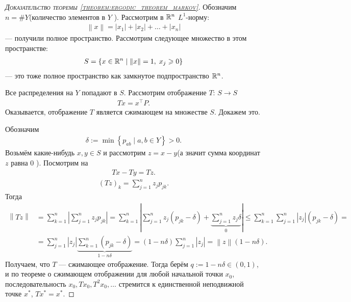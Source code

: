 \documentclass[../main.tex]{subfiles}
\begin{document}
\begin{proof}[\normalfont\textsc{Доказательство теоремы \ref{theorem:ergodic_theorem_markov}}]
 Обозначим $n = \# Y $(количество элементов в $Y$ ). Рассмотрим в $ \mathbb{R}^{n} $ $ L^{1} $-норму:
 \begin{align*}
  \left\| x \right\| = \left| x_1 \right| + \left| x_2 \right| + \ldots + \left| x_n \right|
 \end{align*} --- получили полное пространство. Рассмотрим следующее множество в этом пространстве:
 \begin{align*}
  S = \left\{ x \in \mathbb{R}^{n} \mid \left\| x \right\| = 1,\; x_j \geqslant 0 \right\}
 \end{align*} --- это тоже полное пространство как замкнутое подпространство $ \mathbb{R}^{n} $.

 Все распределения на $ Y $ попадают в $ S $. Рассмотрим отображение $ T \colon\,S\to S $
 \begin{align*}
  T x = x^{\top} P.
 \end{align*} Оказывается, отображение $ T $ является сжимающем на множестве $ S $. Докажем это.

 Обозначим
 \begin{align*}
  \delta := \min \left\{ p_{ab} \mid a,b\in Y \right\} > 0.
 \end{align*} Возьмём какие-нибудь $ x,y \in S $ и рассмотрим $ z = x - y $(а значит сумма координат $z$ равна 0 ). Посмотрим на
 \begin{align*}
  Tx - Ty = Tz.
 \end{align*}
 \begin{align*}
  (Tz)_k = \sum_{j=1}^{n} z_j p_{jk}.
 \end{align*} Тогда
 \begin{align*}
  \left\| Tz \right\| &= \sum_{k=1}^{n} \left|\sum_{j=1}^{n} z_j p_{jk} \right| = \sum_{k=1}^{n} \left| \sum_{j=1}^{n} z_j(p_{jk} - \delta) + \underbrace{\sum_{j=1}^{n} z_j \delta}_0 \right| \leqslant \sum_{k=1}^{n} \sum_{j=1}^{n} \left| z_j \right|(p_{jk} - \delta) = \\
  &= \sum_{j=1}^{n} \left| z_j \right| \underbrace{\sum_{k=1}^{n} (p_{jk} - \delta)}_{1-n\delta} = (1-n\delta) \sum_{j=1}^{n} \left| z_j \right| = \left\| z \right\|(1 - n\delta).
 \end{align*} Получаем, что $ T $ --- сжимающее отображение. Тогда берём $ q := 1 - n\delta \in (0,1) $, и по теореме о сжимающем отображении для любой начальной точки $ x_0 $, последовательность $ x_0, T x_0, T^{2} x_0, \ldots $ стремится к единственной неподвижной точке $ x^{\ast} $, $ T x^{\ast}= x^{\ast} $.
\end{proof}
\end{document}
